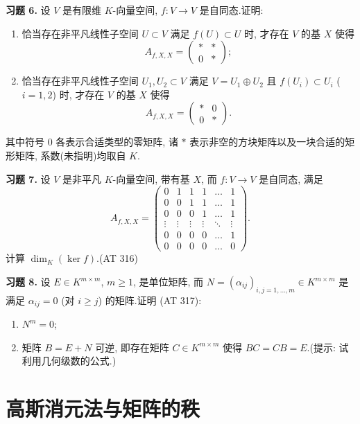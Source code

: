 \noindent\textbf{习题 6.} 设 $V$ 是有限维 $K$-向量空间, $f \colon V \longrightarrow V$ 是自同态.证明:
\begin{enumerate}
\item[(i)] 恰当存在非平凡线性子空间 $U \subset V$ 满足 $f(U) \subset U$ 时, 才存在 $V$ 的基 $X$ 使得
\[
A_{f, X, X} = \begin{pmatrix} * & * \\ 0 & * \end{pmatrix};
\]
\item[(ii)] 恰当存在非平凡线性子空间 $U_1, U_2 \subset V$ 满足 $V = U_1 \oplus U_2$ 且 $f(U_i) \subset U_i$ ($i = 1, 2$) 时, 才存在 $V$ 的基 $X$ 使得
\[
A_{f, X, X} = \begin{pmatrix} * & 0 \\ 0 & * \end{pmatrix}\text{.}
\]
\end{enumerate}
其中符号 $0$ 各表示合适类型的零矩阵, 诸 $*$ 表示非空的方块矩阵以及一块合适的矩形矩阵, 系数(未指明)均取自 $K$.

\noindent\textbf{习题 7.} 设 $V$ 是非平凡 $K$-向量空间, 带有基 $X$, 而 $f \colon V \longrightarrow V$ 是自同态, 满足
\[
A_{f, X, X} =
\begin{pmatrix}
0 & 1 & 1 & 1 & \ldots & 1 \\
0 & 0 & 1 & 1 & \ldots & 1 \\
0 & 0 & 0 & 1 & \ldots & 1 \\
\vdots & \vdots & \vdots & \vdots & \ddots & \vdots \\
0 & 0 & 0 & 0 & \ldots & 1 \\
0 & 0 & 0 & 0 & \ldots & 0
\end{pmatrix}\text{.}
\]
计算 $\dim_K(\ker f)$.(AT 316)

\noindent\textbf{习题 8.} 设 $E \in K^{m \times m}$, $m \geq 1$, 是单位矩阵, 而 $N = (\alpha_{ij})_{i, j = 1, \ldots, m} \in K^{m \times m}$ 是满足 $\alpha_{ij} = 0$ (对 $i \geq j$) 的矩阵.证明 (AT 317):
\begin{enumerate}
\item[(i)] $N^m = 0$;
\item[(ii)] 矩阵 $B = E + N$ 可逆, 即存在矩阵 $C \in K^{m \times m}$ 使得 $BC = CB = E$.(提示: 试利用几何级数的公式.)
\end{enumerate}

\section{高斯消元法与矩阵的秩}\label{sec:3.2}

